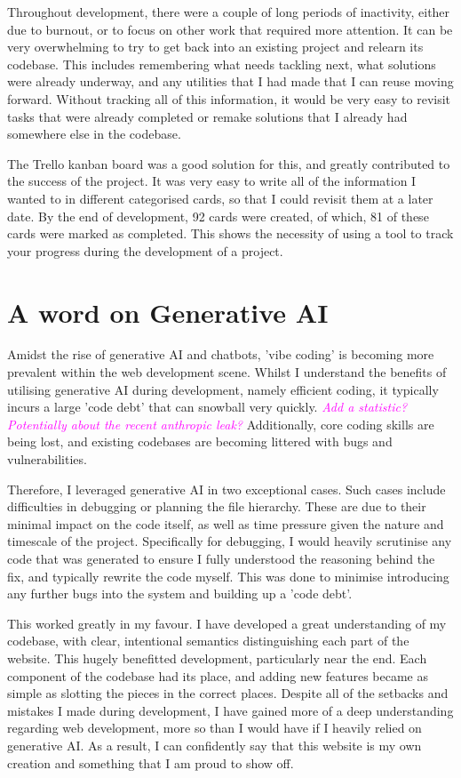 \documentclass{report}
\begin{document}
Throughout development, there were a couple of long periods of inactivity,
either due to burnout, or to focus on other work that required more attention.
It can be very overwhelming to try to get back into an existing project and relearn its codebase.
This includes remembering what needs tackling next, what solutions were already underway,
and any utilities that I had made that I can reuse moving forward.
Without tracking all of this information,
it would be very easy to revisit tasks that were already completed or remake solutions that I already had somewhere else in the codebase.

The Trello kanban board was a good solution for this, and greatly contributed to the success of the project.
It was very easy to write all of the information I wanted to in different categorised cards, so that I could revisit them at a later date.
By the end of development, 92 cards were created, of which, 81 of these cards were marked as completed.
This shows the necessity of using a tool to track your progress during the development of a project.

\section{A word on Generative AI}

Amidst the rise of generative AI and chatbots, 'vibe coding' is becoming more prevalent within the web development scene.
Whilst I understand the benefits of utilising generative AI during development, namely efficient coding,
it typically incurs a large 'code debt' that can snowball very quickly.
\textcolor{magenta}{\textit{Add a statistic? Potentially about the recent anthropic leak?}}
Additionally, core coding skills are being lost, and existing codebases are becoming littered with bugs and vulnerabilities.

Therefore, I leveraged generative AI in two exceptional cases.
Such cases include difficulties in debugging or planning the file hierarchy.
These are due to their minimal impact on the code itself, as well as time pressure given the nature and timescale of the project.
Specifically for debugging, I would heavily scrutinise any code that was generated to ensure I fully understood the reasoning behind the fix,
and typically rewrite the code myself.
This was done to minimise introducing any further bugs into the system and building up a 'code debt'.

This worked greatly in my favour.
I have developed a great understanding of my codebase, with clear, intentional semantics distinguishing each part of the website.
This hugely benefitted development, particularly near the end.
Each component of the codebase had its place,
and adding new features became as simple as slotting the pieces in the correct places.
Despite all of the setbacks and mistakes I made during development,
I have gained more of a deep understanding regarding web development, more so than I would have if I heavily relied on generative AI.
As a result, I can confidently say that this website is my own creation and something that I am proud to show off.
\end{document}
